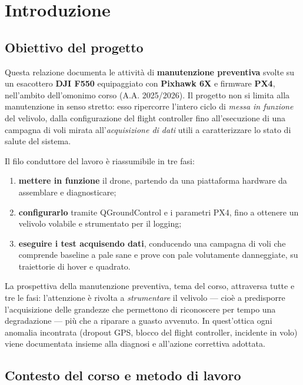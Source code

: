 \chapter{Introduzione}
\label{cap:introduzione}

\section{Obiettivo del progetto}

Questa relazione documenta le attivit\`a di \textbf{manutenzione preventiva}
svolte su un esacottero \textbf{DJI F550} equipaggiato con \textbf{Pixhawk 6X}
e firmware \textbf{PX4}, nell'ambito dell'omonimo corso (A.A. 2025/2026).
Il progetto non si limita alla manutenzione in senso stretto: esso ripercorre
l'intero ciclo di \emph{messa in funzione} del velivolo, dalla configurazione
del flight controller fino all'esecuzione di una campagna di voli mirata
all'\emph{acquisizione di dati} utili a caratterizzare lo stato di salute del
sistema.

Il filo conduttore del lavoro \`e riassumibile in tre fasi:
\begin{enumerate}
  \item \textbf{mettere in funzione} il drone, partendo da una piattaforma
        hardware da assemblare e diagnosticare;
  \item \textbf{configurarlo} tramite QGroundControl e i parametri PX4, fino a
        ottenere un velivolo volabile e strumentato per il logging;
  \item \textbf{eseguire i test acquisendo dati}, conducendo una campagna di
        voli che comprende baseline a pale sane e prove con pale volutamente
        danneggiate, su traiettorie di hover e quadrato.
\end{enumerate}

La prospettiva della manutenzione preventiva, tema del corso, attraversa tutte e
tre le fasi: l'attenzione \`e rivolta a \emph{strumentare} il velivolo --- cio\`e
a predisporre l'acquisizione delle grandezze che permettono di riconoscere per
tempo una degradazione --- pi\`u che a riparare a guasto avvenuto. In quest'ottica
ogni anomalia incontrata (dropout GPS, blocco del flight controller, incidente in
volo) viene documentata insieme alla diagnosi e all'azione correttiva adottata.

\section{Contesto del corso e metodo di lavoro}

